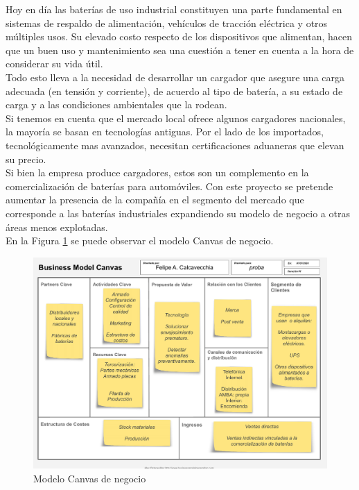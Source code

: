 \documentclass[11pt]{charter}
\begin{document}
Hoy en día las baterías de uso industrial constituyen una parte fundamental en sistemas de respaldo de alimentación, vehículos de tracción eléctrica y otros múltiples usos. Su elevado costo respecto de los  dispositivos que alimentan, hacen que un buen uso y mantenimiento sea una cuestión a tener en cuenta a la hora de considerar su vida útil.
\\[3pt]
Todo esto lleva a la necesidad de desarrollar un cargador que asegure una carga adecuada (en tensión y corriente), de acuerdo al tipo de batería, a su estado de carga y a las condiciones ambientales que la rodean.
\\[3pt]
Si tenemos en cuenta que el mercado local ofrece algunos cargadores nacionales, la mayoría se basan en tecnologías antiguas. Por el lado de los importados, tecnológicamente mas avanzados, necesitan certificaciones aduaneras que elevan su precio.
\\[3pt]
Si bien la empresa produce cargadores, estos son un complemento en la comercialización de baterías para automóviles. Con este proyecto se pretende aumentar la presencia de la compañía en el segmento del mercado que corresponde a las baterías industriales expandiendo su modelo de negocio a otras áreas menos explotadas.\\ 
En la Figura \ref{fig:modeloCanvas} se puede observar el modelo Canvas de negocio.

\begin{figure}[h]
\centering 
\includegraphics[width=.9\textwidth]{./Figuras/Canvas1.pdf}
\caption{Modelo Canvas de negocio}
\label{fig:modeloCanvas}
\end{figure}
\end{document}
